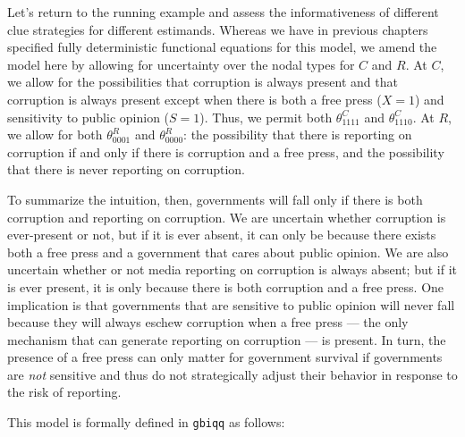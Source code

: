\documentclass[12pt,]{book}
\newenvironment{Shaded}{\begin{snugshade}}{\end{snugshade}}
\newcommand{\DataTypeTok}[1]{\textcolor[rgb]{0.13,0.29,0.53}{#1}}
\newcommand{\KeywordTok}[1]{\textcolor[rgb]{0.13,0.29,0.53}{\textbf{#1}}}
\newcommand{\NormalTok}[1]{#1}
\newcommand{\OperatorTok}[1]{\textcolor[rgb]{0.81,0.36,0.00}{\textbf{#1}}}
\newcommand{\OtherTok}[1]{\textcolor[rgb]{0.56,0.35,0.01}{#1}}
\newcommand{\StringTok}[1]{\textcolor[rgb]{0.31,0.60,0.02}{#1}}
\begin{document}
Let's return to the running example and assess the informativeness of different clue strategies for different estimands. Whereas we have in previous chapters specified fully deterministic functional equations for this model, we amend the model here by allowing for uncertainty over the nodal types for \(C\) and \(R\). At \(C\), we allow for the possibilities that corruption is always present and that corruption is always present except when there is both a free press (\(X=1\)) and sensitivity to public opinion (\(S=1\)). Thus, we permit both \(\theta^C_{1111}\) and \(\theta^C_{1110}\). At \(R\), we allow for both \(\theta^R_{0001}\) and \(\theta^R_{0000}\): the possibility that there is reporting on corruption if and only if there is corruption and a free press, and the possibility that there is never reporting on corruption.

To summarize the intuition, then, governments will fall only if there is both corruption and reporting on corruption. We are uncertain whether corruption is ever-present or not, but if it is ever absent, it can only be because there exists both a free press and a government that cares about public opinion. We are also uncertain whether or not media reporting on corruption is always absent; but if it is ever present, it is only because there is both corruption and a free press. One implication is that governments that are sensitive to public opinion will never fall because they will always eschew corruption when a free press --- the only mechanism that can generate reporting on corruption --- is present. In turn, the presence of a free press can only matter for government survival if governments are \emph{not} sensitive and thus do not strategically adjust their behavior in response to the risk of reporting.

This model is formally defined in \texttt{gbiqq} as follows:

\begin{Shaded}
\end{Shaded}
\end{document}
